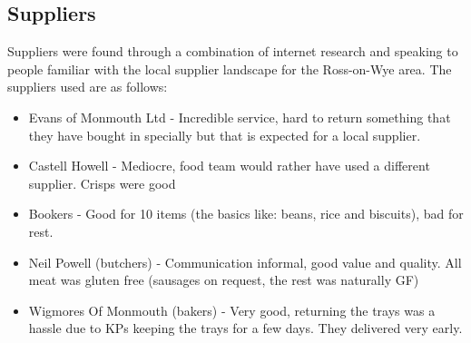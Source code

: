 \subsection{Suppliers}
Suppliers were found through a combination of internet research and speaking to people familiar with the local supplier landscape for the Ross-on-Wye area. The suppliers used are as follows:
\begin{itemize}
    \item Evans of Monmouth Ltd - Incredible service, hard to return something that they have bought in specially but that is expected for a local supplier.
    \item Castell Howell - Mediocre, food team would rather have used a different supplier. Crisps were good
    \item Bookers - Good for 10 items (the basics like: beans, rice and biscuits), bad for rest.
    \item Neil Powell (butchers) - Communication informal, good value and quality. All meat was gluten free (sausages on request, the rest was naturally GF)
    \item Wigmores Of Monmouth (bakers) - Very good, returning the trays was a hassle due to KPs keeping the trays for a few days. They delivered very early.
\end{itemize}